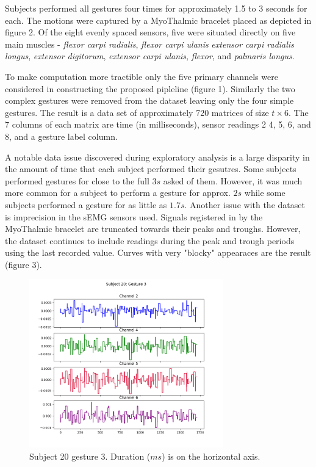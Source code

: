 \documentclass[11pt]{article}
\begin{document}
\begin{enumerate}
Subjects performed all gestures four times for approximately 1.5 to 3 seconds for each. The motions were captured by a MyoThalmic bracelet placed as depicted in figure 2. Of the eight evenly spaced sensors, five were situated directly on five main muscles - \emph{flexor carpi radialis}, \emph{flexor carpi ulanis} \emph{extensor carpi radialis longus}, \emph{extensor digitorum}, \emph{extensor carpi ulanis}, \emph{flexor}, and \emph{palmaris longus}.

To make computation more tractible only the five primary channels were considered in constructing the proposed pipleline (figure 1). Similarly the two complex gestures were removed from the dataset leaving only the four simple gestures. The result is a data set of approximately 720 matrices of size $t \times 6$. The 7 columns of each matrix are time (in milliseconds), sensor readings 2 4, 5, 6, and 8, and a gesture label column.

A notable data issue discovered during exploratory analysis is a large disparity in the amount of time that each subject performed their gesutres. Some subjects performed gestures for close to the full $3s$ asked of them. However, it was much more common for a subject to perform a gesture for approx. $2s$ while some subjects performed a gesture for as little as $1.7s$. Another issue with the dataset is imprecision in the sEMG sensors used. Signals registered in by the MyoThalmic bracelet are truncated towards their peaks and troughs. However, the dataset continues to include readings during the peak and trough periods using the last recorded value. Curves with very "blocky" appearaces are the result (figure 3).

\begin{figure}[h]
\centering
\includegraphics[width=0.75\textwidth]{s20g3}
\caption{Subject 20 gesture 3. Duration ($ms$) is on the horizontal axis.}
\end{figure}


\end{enumerate}
\end{document}
